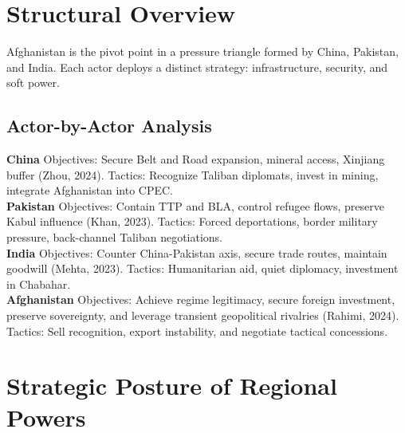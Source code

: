 \documentclass[11pt]{article}
\begin{document}
\section*{Structural Overview}

Afghanistan is the pivot point in a pressure triangle formed by China, Pakistan, and India. Each actor deploys a distinct strategy: infrastructure, security, and soft power.

\subsection*{Actor-by-Actor Analysis}

\textbf{China} Objectives: Secure Belt and Road expansion, mineral access, Xinjiang buffer (Zhou, 2024). Tactics: Recognize Taliban diplomats, invest in mining, integrate Afghanistan into CPEC.\\
\textbf{Pakistan} Objectives: Contain TTP and BLA, control refugee flows, preserve Kabul influence (Khan, 2023). Tactics: Forced deportations, border military pressure, back-channel Taliban negotiations.\\
\textbf{India} Objectives: Counter China-Pakistan axis, secure trade routes, maintain goodwill (Mehta, 2023). Tactics: Humanitarian aid, quiet diplomacy, investment in Chabahar.\\
\textbf{Afghanistan} Objectives: Achieve regime legitimacy, secure foreign investment, preserve sovereignty, and leverage transient geopolitical rivalries (Rahimi, 2024). Tactics: Sell recognition, export instability, and negotiate tactical concessions.

\section*{Strategic Posture of Regional Powers}
\end{document}
